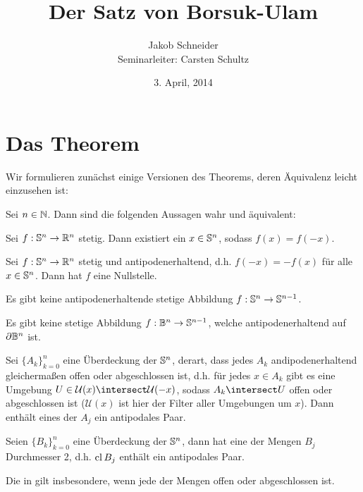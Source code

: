 \documentclass[10pt,a4paper]{article}
\begin{document}
\author{Jakob Schneider\\ Seminarleiter: Carsten Schultz}
\date{3. April, 2014}
\title{Der Satz von Borsuk-Ulam}
\maketitle

\section{Das Theorem}

Wir formulieren zunächst einige Versionen des Theorems, deren Äquivalenz leicht einzusehen ist:

\begin{theorem}\label{thm:1}
    Sei $n\in\mathbb{N}$. Dann sind die folgenden Aussagen wahr und äquivalent:
    \begin{statements}
            \item\label{stm:1} Sei $f:\mathbb{S}^n\rightarrow \mathbb{R}^n$ stetig. Dann existiert ein $x\in\mathbb{S}^n$, sodass $f(x)=f(-x)$.\label{0}
            \item\label{stm:2}Sei $f:\mathbb{S}^n\rightarrow \mathbb{R}^n$ stetig und antipodenerhaltend, d.h. $f(-x)=-f(x)$ für alle $x\in\mathbb{S}^n$. Dann hat $f$ eine Nullstelle.
            \item\label{stm:3} Es gibt keine antipodenerhaltende stetige Abbildung $f:\mathbb{S}^n\rightarrow\mathbb{S}^{n-1}$.
            \item\label{stm:4} Es gibt keine stetige Abbildung $f:\mathbb{B}^n\rightarrow\mathbb{S}^{n-1}$, welche antipodenerhaltend auf $\partial{\mathbb{B}^n}$ ist.
            \item\label{stm:5} Sei $\{A_k\}_{k=0}^n$ eine Überdeckung der $\mathbb{S}^n$, derart, dass jedes $A_k$ andipodenerhaltend gleichermaßen offen oder abgeschlossen ist, d.h. für jedes $x\in A_k$ gibt es eine Umgebung $U\in\mathcal{U}(x)\intersect\mathcal{U}(-x)$, sodass $A_k\intersect U$ offen oder abgeschlossen ist ($\mathcal{U}(x)$ ist hier der Filter aller Umgebungen um $x$). Dann enthält eines der $A_j$ ein antipodales Paar. 
            \item\label{stm:6} Seien $\{B_k\}_{k=0}^n$ eine Überdeckung der $\mathbb{S}^n$, dann hat eine der Mengen $B_j$ Durchmesser 2, d.h. $\mathop\mathrm{cl}{B_j}$ enthält ein antipodales Paar.
    \end{statements}
\end{theorem}

\begin{remark}
    Die 
    in  gilt insbesondere, wenn jede der Mengen offen oder abgeschlossen ist.
\end{remark}
\end{document}
